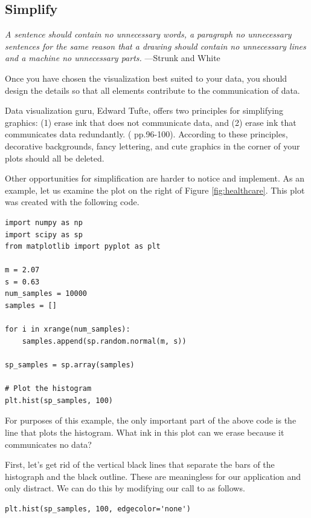 \subsection*{Simplify}

\noindent\emph{A sentence should contain no unnecessary words, a paragraph no unnecessary sentences for the same reason that a drawing should contain no unnecessary lines and a machine no unnecessary parts.} \small{---Strunk and White}


Once you have chosen the visualization best suited to your data, you should design the details so that all elements contribute to the communication of data. 

Data visualization guru, Edward Tufte, offers two principles for simplifying graphics: (1) erase ink that does not communicate data, and (2) erase ink that communicates data redundantly.  (\cite{tufte2001} pp.96-100). According to these principles, decorative backgrounds, fancy lettering, and cute graphics in the corner of your plots should all be deleted.

Other opportunities for simplification are harder to notice and implement. As an example, let us examine the plot on the right of Figure \ref{fig:healthcare}. 
This plot was created with the following code.

\begin{lstlisting}
import numpy as np
import scipy as sp
from matplotlib import pyplot as plt

m = 2.07
s = 0.63
num_samples = 10000
samples = []

for i in xrange(num_samples):
    samples.append(sp.random.normal(m, s)) 

sp_samples = sp.array(samples)

# Plot the histogram
plt.hist(sp_samples, 100)
\end{lstlisting}

For purposes of this example, the only important part of the above code is the line  that plots the histogram. 
What ink in this plot can we erase because it communicates no data?

First, let's get rid of the vertical black lines that separate the bars of the histograph and the black outline. These are meaningless for our application and only distract. 
We can do this by modifying our call to  as follows.

\begin{lstlisting}
plt.hist(sp_samples, 100, edgecolor='none')
\end{lstlisting}


